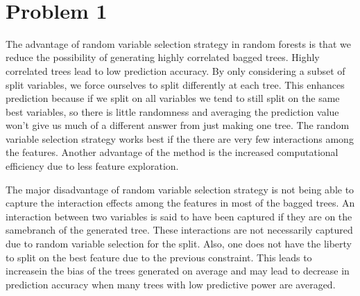 \documentclass[11pt]{article}
\begin{document}
\begin{center}

\ \\
\end{center}

\section*{Problem 1}

\vspace{5 mm}
\noindent
The advantage of random variable selection strategy in random forests is that
we reduce the possibility of generating highly correlated bagged trees. Highly
correlated trees lead to low prediction accuracy. By only considering a subset 
of split variables, we force ourselves to split differently at each tree. This 
enhances prediction because if we split on all variables we tend to still split
on the same best variables, so there is little randomness and averaging the 
prediction value won't give us much of a different answer from just making
one tree. The random variable selection strategy works best if the there are 
very few interactions among the features. Another advantage of the method is 
the increased computational efficiency due to less feature exploration. 

\vspace{5 mm}
\noindent
The major disadvantage of random variable selection strategy is not being able 
to capture the interaction effects among the features in most of the bagged 
trees. An interaction between two variables is said to have been captured if 
they are on the samebranch of the generated tree. These interactions are not 
necessarily captured due to random variable selection for the split. Also, one 
does not have the liberty to split on the best feature due to the previous 
constraint. This leads to increasein the bias of the trees generated on average 
and may lead to decrease in prediction accuracy when many trees with low 
predictive power are averaged.
\end{document}
